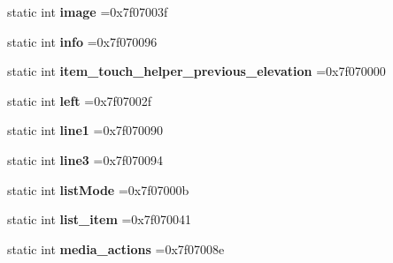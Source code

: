 \begin{DoxyCompactItemize}
static int {\bfseries image} =0x7f07003f
\item 
\mbox{\label{classandroid_1_1support_1_1v7_1_1mediarouter_1_1R_1_1id_a387af1954ca5fc76e942bd1612985011}} 
static int {\bfseries info} =0x7f070096
\item 
\mbox{\label{classandroid_1_1support_1_1v7_1_1mediarouter_1_1R_1_1id_a322ba284555c91bc7d5438db19a49c5b}} 
static int {\bfseries item\+\_\+touch\+\_\+helper\+\_\+previous\+\_\+elevation} =0x7f070000
\item 
\mbox{\label{classandroid_1_1support_1_1v7_1_1mediarouter_1_1R_1_1id_aa5e575bed16b357a345c14ea0d76634e}} 
static int {\bfseries left} =0x7f07002f
\item 
\mbox{\label{classandroid_1_1support_1_1v7_1_1mediarouter_1_1R_1_1id_a3656f95c2d9677e009bed74ce6f75530}} 
static int {\bfseries line1} =0x7f070090
\item 
\mbox{\label{classandroid_1_1support_1_1v7_1_1mediarouter_1_1R_1_1id_a2bd19a65288e409abf7850c42686eebd}} 
static int {\bfseries line3} =0x7f070094
\item 
\mbox{\label{classandroid_1_1support_1_1v7_1_1mediarouter_1_1R_1_1id_aaae36cac22a9dda7464c6352c887b184}} 
static int {\bfseries list\+Mode} =0x7f07000b
\item 
\mbox{\label{classandroid_1_1support_1_1v7_1_1mediarouter_1_1R_1_1id_a0ee3dcf078cd1ba1e71bfb626c739758}} 
static int {\bfseries list\+\_\+item} =0x7f070041
\item 
\mbox{\label{classandroid_1_1support_1_1v7_1_1mediarouter_1_1R_1_1id_a92656281ab9d3131c21b95d73539cbe7}} 
static int {\bfseries media\+\_\+actions} =0x7f07008e
\item 
\mbox{\label{classandroid_1_1support_1_1v7_1_1mediarouter_1_1R_1_1id_a74f5cb7b776f5d48e38b4b3be0f90917}} 

\end{DoxyCompactItemize}
